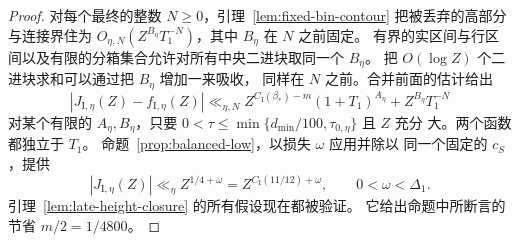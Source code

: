 \begin{proof}
对每个最终的整数 $N\ge0$，引理~\ref{lem:fixed-bin-contour}
把被丢弃的高部分与连接界住为
$O_{\eta,N}(Z^{B_\eta}T_1^{-N})$，其中 $B_\eta$ 在 $N$ 之前固定。
有界的实区间与行区间以及有限的分箱集合允许对所有中央二进块取同一个
$B_\eta$。
把 $O(\log Z)$ 个二进块求和可以通过把 $B_\eta$ 增加一来吸收，
同样在 $N$ 之前。合并前面的估计给出
\[
 |J_{\mathrm I,\eta}(Z)-f_{\mathrm I,\eta}(Z)|
 \ll_{\eta,N}Z^{C_{\mathrm I}(\beta_*)-m}(1+T_1)^{A_\eta}
       +Z^{B_\eta}T_1^{-N}
\]
对某个有限的 $A_\eta,B_\eta$，只要
$0<\tau\le\min\{d_{\min}/100,\tau_{0,\eta}\}$ 且 $Z$ 充分
大。两个函数都独立于 $T_1$。
命题~\ref{prop:balanced-low}，以损失 $\omega$ 应用并除以
同一个固定的 $c_S$，提供
\[
 |J_{\mathrm I,\eta}(Z)|\ll_\eta
 Z^{1/4+\omega}=Z^{C_{\mathrm I}(11/12)+\omega},
 \qquad 0<\omega<\Delta_1.
\]
引理~\ref{lem:late-height-closure} 的所有假设现在都被验证。
它给出命题中所断言的节省 $m/2=1/4800$。
\end{proof}
